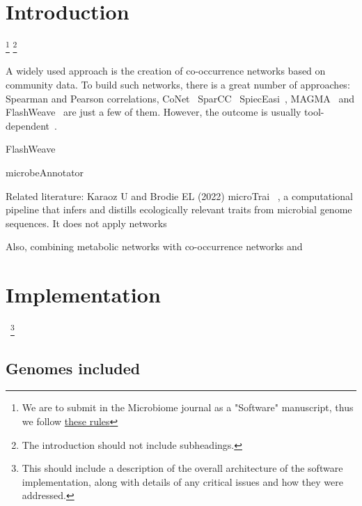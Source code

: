 \documentclass[sn-mathphys,Numbered]{sn-jnl}%
\theoremstyle{thmstyleone}%
\theoremstyle{thmstyletwo}%
\theoremstyle{thmstylethree}%
\begin{document}
\section{Introduction}
\label{sec1}
\footnote{We are to submit in the Microbiome journal as a "Software" manuscript, thus we follow 
\href{https://microbiomejournal.biomedcentral.com/submission-guidelines/preparing-your-manuscript/software-article}{these rules}}
\footnote{The introduction should not include subheadings.}

    A widely used approach is the creation of co-occurrence networks based on community data. To build such networks, there is a great number of approaches: Spearman and Pearson correlations, CoNet~\cite{faust2012microbial} SparCC~\cite{friedman2012inferring} SpiecEasi~\cite{kurtz2015sparse}, MAGMA~\cite{cougoul2019magma} and FlashWeave~\cite{flashweave_cite} are just a few of them.
    However, the outcome is usually tool-dependent~\cite{kishore2023inferring, weiss2016correlation, rottjers2018hairballs}. 

    FlashWeave 

    microbeAnnotator~\cite{ruiz2021microbeannotator} 


    Related literature:
    Karaoz U and Brodie EL (2022) microTrai~\cite{karaoz2022microtrait} , a computational pipeline that infers and distills ecologically relevant traits from microbial genome sequences.
    It does not apply networks

    Also, combining metabolic networks with co-occurrence networks 
    \cite{zelezniak2015metabolic}
    and
    \cite{levy2013metabolic}





\section{Implementation}~\footnote{This should include a description of the overall architecture of the software implementation, along with details of any critical issues and how they were addressed.}
    \label{sec:implementation}

    \subsection*{Genomes included}
        \label{subsec:genomes}
\end{document}
